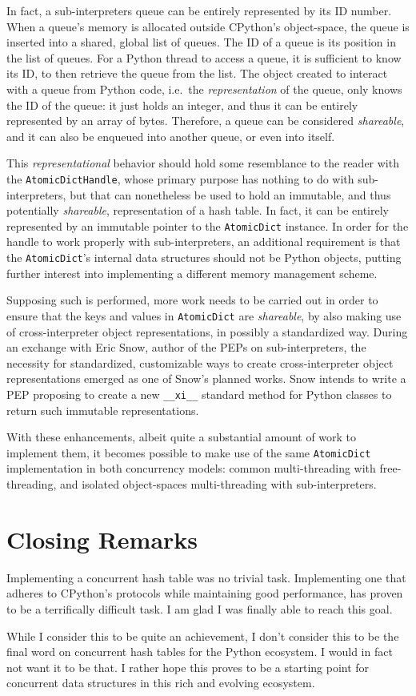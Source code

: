 In fact, a sub-interpreters queue can be entirely represented by its ID number.
When a queue's memory is allocated outside CPython's object-space, the queue is inserted into a shared, global list of queues.
The ID of a queue is its position in the list of queues.
For a Python thread to access a queue, it is sufficient to know its ID, to then retrieve the queue from the list.
The object created to interact with a queue from Python code, i.e.\ the \emph{representation} of the queue, only knows the ID of the queue: it just holds an integer, and thus it can be entirely represented by an array of bytes.
Therefore, a queue can be considered \emph{shareable}, and it can also be enqueued into another queue, or even into itself.

This \emph{representational} behavior should hold some resemblance to the reader with the \texttt{AtomicDictHandle}, whose primary purpose has nothing to do with sub-interpreters, but that can nonetheless be used to hold an immutable, and thus potentially \emph{shareable}, representation of a hash table.
In fact, it can be entirely represented by an immutable pointer to the \texttt{AtomicDict} instance.
In order for the handle to work properly with sub-interpreters, an additional requirement is that the \texttt{AtomicDict}'s internal data structures should not be Python objects, putting further interest into implementing a different memory management scheme.

Supposing such is performed, more work needs to be carried out in order to ensure that the keys and values in \texttt{AtomicDict} are \emph{shareable}, by also making use of cross-interpreter object representations, in possibly a standardized way.
During an exchange with Eric Snow, author of the PEPs on sub-interpreters, the necessity for standardized, customizable ways to create cross-interpreter object representations emerged as one of Snow's planned works.
Snow intends to write a PEP proposing to create a new \texttt{\_\_xi\_\_} standard method for Python classes to return such immutable representations.

With these enhancements, albeit quite a substantial amount of work to implement them, it becomes possible to make use of the same \texttt{AtomicDict} implementation in both concurrency models: common multi-threading with free-threading, and isolated object-spaces multi-threading with sub-interpreters.


\section{Closing Remarks}\label{sec:closing-remarks}

Implementing a concurrent hash table was no trivial task.
Implementing one that adheres to CPython's protocols while maintaining good performance, has proven to be a terrifically difficult task.
I am glad I was finally able to reach this goal.

While I consider this to be quite an achievement, I don't consider this to be the final word on concurrent hash tables for the Python ecosystem.
I would in fact not want it to be that.
I rather hope this proves to be a starting point for concurrent data structures in this rich and evolving ecosystem.
